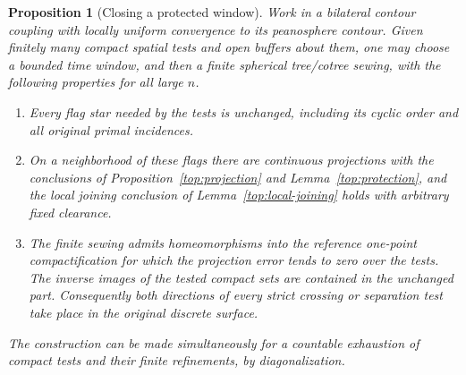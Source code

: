 \documentclass[11pt]{article}
\numberwithin{equation}{section}
\newtheorem{proposition}[theorem]{Proposition}
\theoremstyle{definition}
\theoremstyle{remark}
\newcommand{\1}{\mathbf 1}
\begin{document}
\begin{proposition}[Closing a protected window]
\label{top:protected-window}
Work in a bilateral contour coupling with locally uniform convergence
to its peanosphere contour.  Given finitely many compact spatial
tests and open buffers about them, one may choose a bounded time
window, and then a finite spherical tree/cotree sewing, with the
following properties for all large $n$.
\begin{enumerate}[label=(\roman*)]
\item Every flag star needed by the tests is unchanged, including its
cyclic order and all original primal incidences.
\item On a neighborhood of these flags there are continuous projections
with the conclusions of Proposition~\ref{top:projection} and
Lemma~\ref{top:protection}, and the local joining conclusion of
Lemma~\ref{top:local-joining} holds with arbitrary fixed clearance.
\item The finite sewing admits homeomorphisms into the reference
one-point compactification for which the projection error tends to
zero over the tests.  The inverse images of the tested compact sets
are contained in the unchanged part.  Consequently both directions
of every strict crossing or separation test take place in the
original discrete surface.
\end{enumerate}
The construction can be made simultaneously for a countable exhaustion
of compact tests and their finite refinements, by diagonalization.
\end{proposition}
\end{document}
